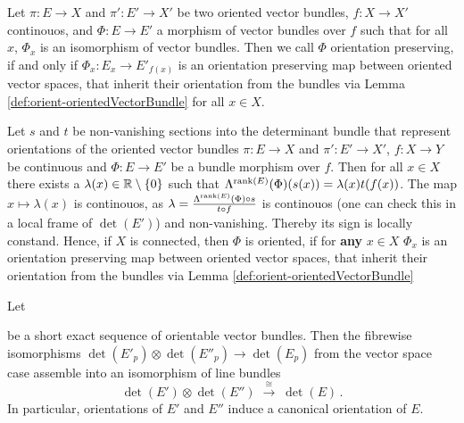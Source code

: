 \begin{definition}
    Let $\pi: E\to X$ and $\pi':E'\to X'$ be two oriented vector bundles, $f:X\to X'$ continouos, and $\Phi:E\to E'$ a morphism of vector bundles over $f$ such that for all $x$, $\Phi_x$ is an isomorphism of vector bundles. Then we call $\Phi$ orientation preserving, if and only if $\Phi_x:E_x\to E'_{f(x)}$ is an orientation preserving map between oriented vector spaces, that inherit their orientation from the bundles via Lemma \ref{def:orient-orientedVectorBundle} for all $x\in X$. 
\end{definition}
\begin{proposition}\label{def:orient-orientedMorphismOfBundlesEquivalentDef}
    Let $s$ and $t$ be non-vanishing sections into the determinant bundle that represent orientations of the oriented vector bundles $\pi: E\to X$ and $\pi':E'\to X'$, $f:X\to Y$ be continuous and $\Phi: E\to E'$ be a bundle morphism over $f$. Then for all $x\in X$ there exists a $\lambda(x)\in \mathbb{R}\setminus \{0\}$ such that $\Lambda^{\operatorname{\mathrm{rank}}(E)}(\Phi)(s(x))=\lambda(x)t(f(x))$. The map $x\mapsto \lambda(x)$ is continouos, as $\lambda=\frac{\Lambda^{\operatorname{\mathrm{rank}}(E)}(\Phi)\circ s}{t\circ f}$ is continouos (one can check this in a local frame of $\det(E')$) and non-vanishing. Thereby its sign is locally constand. Hence, if $X$ is connected, then $\Phi$ is oriented, if for \textbf{any} $x\in X$ $\Phi_x$ is an orientation preserving map between oriented vector spaces, that inherit their orientation from the bundles via Lemma \ref{def:orient-orientedVectorBundle}
\end{proposition}
\begin{proposition}
	Let 
	\begin{center}
	\end{center} be a short exact sequence of orientable vector bundles. Then the fibrewise
    isomorphisms $\det(E'_p)\otimes\det(E''_p)\to\det(E_p)$ from the
    vector space case assemble into an isomorphism of line bundles
    \[
        \det(E')\otimes\det(E'')\;\xrightarrow{\;\cong\;}\;\det(E)\,.
    \]
    In particular, orientations of $E'$ and $E''$ induce a canonical
    orientation of $E$.
\end{proposition}
